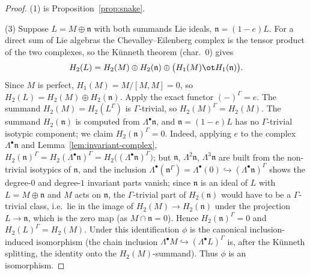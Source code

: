 \documentclass{amsart}
\theoremstyle{definition}
\newcommand{\nn}{\mathfrak{n}}
\newcommand{\Gm}{\Gamma}
\begin{document}
\begin{proof}
(1) is Proposition~\ref{prop:snake}.

\smallskip
(3) Suppose $L=M\oplus\nn$ with both summands Lie ideals, $\nn=(1-e)L$.  For a
direct sum of Lie algebras the Chevalley--Eilenberg complex is the tensor product
of the two complexes, so the K\"unneth theorem (char.\ $0$) gives
\[
   H_2(L)=H_2(M)\oplus H_2(\nn)\oplus\bigl(H_1(M)\ot H_1(\nn)\bigr).
\]
Since $M$ is perfect, $H_1(M)=M/[M,M]=0$, so $H_2(L)=H_2(M)\oplus H_2(\nn)$.  Apply
the exact functor $(-)^{\Gm}=e$.  The summand $H_2(M)=H_2(L^{\Gm})$ is
$\Gm$-trivial, so $H_2(M)^{\Gm}=H_2(M)$.  The summand $H_2(\nn)$ is computed from
$\Lambda^\bullet\nn$, and $\nn=(1-e)L$ has no $\Gm$-trivial isotypic component; we
claim $H_2(\nn)^{\Gm}=0$.  Indeed, applying $e$ to the complex $\Lambda^\bullet\nn$
and Lemma~\ref{lem:invariant-complex}, $H_2(\nn)^{\Gm}=H_2(\Lambda^\bullet\nn)^{\Gm}
=H_2\bigl((\Lambda^\bullet\nn)^{\Gm}\bigr)$; but $\nn$, $\Lambda^2\nn$,
$\Lambda^3\nn$ are built from the non-trivial isotypics of $\nn$, and the inclusion
$\Lambda^\bullet(\nn^{\Gm})=\Lambda^\bullet(0)\hookrightarrow(\Lambda^\bullet\nn)^{\Gm}$
shows the degree-$0$ and degree-$1$ invariant parts vanish; since $\nn$ is an ideal
of $L$ with $L=M\oplus\nn$ and $M$ acts on $\nn$, the $\Gm$-trivial part of
$H_2(\nn)$ would have to be a $\Gm$-trivial class, i.e.\ lie in the image of
$H_2(M)\to H_2(\nn)$ under the projection $L\to\nn$, which is the zero map (as
$M\cap\nn=0$).  Hence $H_2(\nn)^{\Gm}=0$ and $H_2(L)^{\Gm}=H_2(M)$.  Under this
identification $\phi$ is the canonical inclusion-induced isomorphism (the chain
inclusion $\Lambda^\bullet M\hookrightarrow(\Lambda^\bullet L)^{\Gm}$ is, after the
K\"unneth splitting, the identity onto the $H_2(M)$-summand).  Thus $\phi$ is an
isomorphism.


\end{proof}
\end{document}
